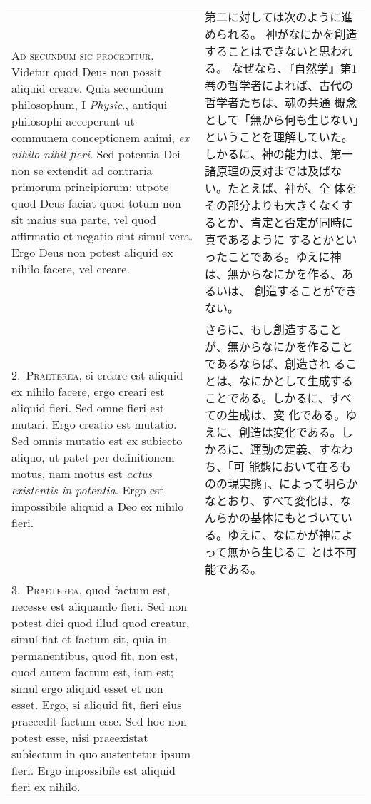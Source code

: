 \documentclass[10pt]{jsarticle} %
\begin{document}
\begin{longtable}{p{21em}p{21em}}


{\huge A}{\scshape d secundum sic proceditur}. Videtur quod Deus non possit aliquid
 creare. Quia secundum philosophum, I {\it Physic}., antiqui philosophi
 acceperunt ut communem conceptionem animi, {\it ex nihilo nihil fieri}. Sed
 potentia Dei non se extendit ad contraria primorum principiorum; utpote
 quod Deus faciat quod totum non sit maius sua parte, vel quod
 affirmatio et negatio sint simul vera. Ergo Deus non potest aliquid ex
 nihilo facere, vel creare.

&

第二に対しては次のように進められる。
神がなにかを創造することはできないと思われる。
なぜなら、『自然学』第1巻の哲学者によれば、古代の哲学者たちは、魂の共通
 概念として「無から何も生じない」ということを理解していた。
しかるに、神の能力は、第一諸原理の反対までは及ばない。たとえば、神が、全
 体をその部分よりも大きくなくするとか、肯定と否定が同時に真であるように
 するとかといったことである。ゆえに神は、無からなにかを作る、あるいは、
 創造することができない。

\\

2.~{\scshape Praeterea}, si creare est aliquid ex nihilo facere, ergo creari est
 aliquid fieri. Sed omne fieri est mutari. Ergo creatio est mutatio. Sed
 omnis mutatio est ex subiecto aliquo, ut patet per definitionem motus,
 nam motus est {\it actus existentis in potentia}. Ergo est impossibile
 aliquid a Deo ex nihilo fieri.

&
さらに、もし創造することが、無からなにかを作ることであるならば、創造され
 ることは、なにかとして生成することである。しかるに、すべての生成は、変
 化である。ゆえに、創造は変化である。しかるに、運動の定義、すなわち、「可
 能態において在るものの現実態」、によって明らかなとおり、すべて変化は、な
 んらかの基体にもとづいている。ゆえに、なにかが神によって無から生じるこ
 とは不可能である。


\\

3.~{\scshape Praeterea}, quod factum est, necesse est aliquando fieri. Sed non potest
 dici quod illud quod creatur, simul fiat et factum sit, quia in
 permanentibus, quod fit, non est, quod autem factum est, iam est; simul
 ergo aliquid esset et non esset. Ergo, si aliquid fit, fieri eius
 praecedit factum esse. Sed hoc non potest esse, nisi praeexistat
 subiectum in quo sustentetur ipsum fieri. Ergo impossibile est aliquid
 fieri ex nihilo.


\end{longtable}
\end{document}

